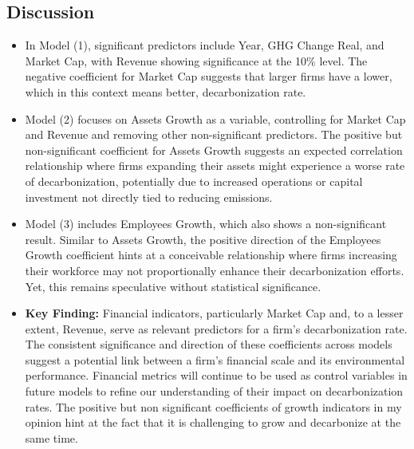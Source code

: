 \subsection{Discussion}
\begin{itemize}
    \item In Model (1), significant predictors include Year, GHG Change Real, and Market Cap, with Revenue showing significance at the 10\% level. The negative coefficient for Market Cap suggests that larger firms have a lower, which in this context means better, decarbonization rate.
    
    \item Model (2) focuses on Assets Growth as a variable, controlling for Market Cap and Revenue and removing other non-significant predictors. The positive but non-significant coefficient for Assets Growth suggests an expected correlation relationship where firms expanding their assets might experience a worse rate of decarbonization, potentially due to increased operations or capital investment not directly tied to reducing emissions.
    
    \item Model (3) includes Employees Growth, which also shows a non-significant result. Similar to Assets Growth, the positive direction of the Employees Growth coefficient hints at a conceivable relationship where firms increasing their workforce may not proportionally enhance their decarbonization efforts. Yet, this remains speculative without statistical significance. 
    
    \item \textbf{Key Finding:} Financial indicators, particularly Market Cap and, to a lesser extent, Revenue, serve as relevant predictors for a firm's decarbonization rate. The consistent significance and direction of these coefficients across models suggest a potential link between a firm's financial scale and its environmental performance. Financial metrics will continue to be used as control variables in future models to refine our understanding of their impact on decarbonization rates. The positive but non significant coefficients of growth indicators in my opinion hint at the fact that it is challenging to grow and decarbonize at the same time.
\end{itemize}





